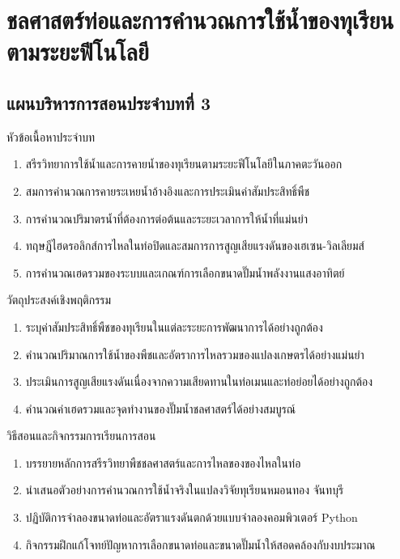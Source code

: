 \chapter{ชลศาสตร์ท่อและการคำนวณการใช้น้ำของทุเรียนตามระยะฟีโนโลยี}
\label{chap:ch03}

\section*{แผนบริหารการสอนประจำบทที่ 3}

\begin{planbox}{หัวข้อเนื้อหาประจำบท}
\begin{enumerate}[topsep=2pt, itemsep=1pt, partopsep=0pt, parsep=0pt, leftmargin=1.5em]
    \item สรีรวิทยาการใช้น้ำและการคายน้ำของทุเรียนตามระยะฟีโนโลยีในภาคตะวันออก
    \item สมการคำนวณการคายระเหยน้ำอ้างอิงและการประเมินค่าสัมประสิทธิ์พืช
    \item การคำนวณปริมาตรน้ำที่ต้องการต่อต้นและระยะเวลาการให้น้ำที่แม่นยำ
    \item ทฤษฎีไฮดรอลิกส์การไหลในท่อปิดและสมการการสูญเสียแรงดันของเฮเซน-วิลเลียมส์
    \item การคำนวณเฮดรวมของระบบและเกณฑ์การเลือกขนาดปั๊มน้ำพลังงานแสงอาทิตย์
\end{enumerate}
\end{planbox}

\begin{planbox}{วัตถุประสงค์เชิงพฤติกรรม}
\begin{enumerate}[topsep=2pt, itemsep=1pt, partopsep=0pt, parsep=0pt, leftmargin=1.5em]
    \item ระบุค่าสัมประสิทธิ์พืชของทุเรียนในแต่ละระยะการพัฒนาการได้อย่างถูกต้อง
    \item คำนวณปริมาณการใช้น้ำของพืชและอัตราการไหลรวมของแปลงเกษตรได้อย่างแม่นยำ
    \item ประเมินการสูญเสียแรงดันเนื่องจากความเสียดทานในท่อเมนและท่อย่อยได้อย่างถูกต้อง
    \item คำนวณค่าเฮดรวมและจุดทำงานของปั๊มน้ำชลศาสตร์ได้อย่างสมบูรณ์
\end{enumerate}
\end{planbox}

\newpage

\begin{planbox}{วิธีสอนและกิจกรรมการเรียนการสอน}
\begin{enumerate}[topsep=2pt, itemsep=1pt, partopsep=0pt, parsep=0pt, leftmargin=1.5em]
    \item บรรยายหลักการสรีรวิทยาพืชชลศาสตร์และการไหลของของไหลในท่อ
    \item นำเสนอตัวอย่างการคำนวณการใช้น้ำจริงในแปลงวิจัยทุเรียนหมอนทอง จันทบุรี
    \item ปฏิบัติการจำลองขนาดท่อและอัตราแรงดันตกด้วยแบบจำลองคอมพิวเตอร์ Python
    \item กิจกรรมฝึกแก้โจทย์ปัญหาการเลือกขนาดท่อและขนาดปั๊มน้ำให้สอดคล้องกับงบประมาณ
\end{enumerate}
\end{planbox}

